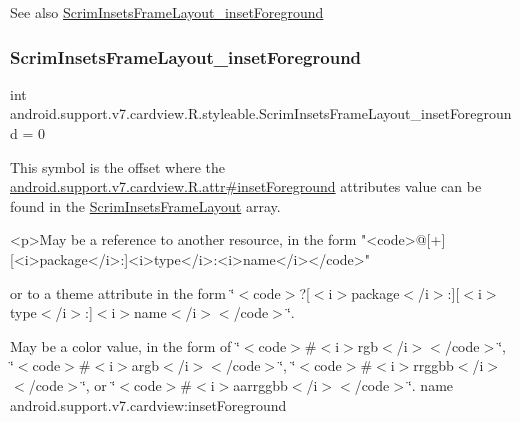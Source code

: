 \begin{DoxySeeAlso}{See also}
\hyperlink{classandroid_1_1support_1_1v7_1_1cardview_1_1R_1_1styleable_ab666cfd5d44681b7ad44530a1c3ac75b}{Scrim\+Insets\+Frame\+Layout\+\_\+inset\+Foreground} 
\end{DoxySeeAlso}
\mbox{\label{classandroid_1_1support_1_1v7_1_1cardview_1_1R_1_1styleable_ab666cfd5d44681b7ad44530a1c3ac75b}} 
\subsubsection{\texorpdfstring{Scrim\+Insets\+Frame\+Layout\+\_\+inset\+Foreground}{ScrimInsetsFrameLayout\_insetForeground}}
{\footnotesize\ttfamily int android.\+support.\+v7.\+cardview.\+R.\+styleable.\+Scrim\+Insets\+Frame\+Layout\+\_\+inset\+Foreground = 0\hspace{0.3cm}{\ttfamily [static]}}

This symbol is the offset where the \hyperlink{classandroid_1_1support_1_1v7_1_1cardview_1_1R_1_1attr_a95795ef97b87d63d0925b2729ce66ec9}{android.\+support.\+v7.\+cardview.\+R.\+attr\#inset\+Foreground} attribute\textquotesingle{}s value can be found in the \hyperlink{classandroid_1_1support_1_1v7_1_1cardview_1_1R_1_1styleable_a985cd1ba52cab7e08da09a84b07a9d58}{Scrim\+Insets\+Frame\+Layout} array.

\begin{DoxyVerb}      <p>May be a reference to another resource, in the form "<code>@[+][<i>package</i>:]<i>type</i>:<i>name</i></code>"
\end{DoxyVerb}
 or to a theme attribute in the form \char`\"{}$<$code$>$?\mbox{[}$<$i$>$package$<$/i$>$\+:\mbox{]}\mbox{[}$<$i$>$type$<$/i$>$\+:\mbox{]}$<$i$>$name$<$/i$>$$<$/code$>$\char`\"{}. 

May be a color value, in the form of \char`\"{}$<$code$>$\#$<$i$>$rgb$<$/i$>$$<$/code$>$\char`\"{}, \char`\"{}$<$code$>$\#$<$i$>$argb$<$/i$>$$<$/code$>$\char`\"{}, \char`\"{}$<$code$>$\#$<$i$>$rrggbb$<$/i$>$$<$/code$>$\char`\"{}, or \char`\"{}$<$code$>$\#$<$i$>$aarrggbb$<$/i$>$$<$/code$>$\char`\"{}.  name android.\+support.\+v7.\+cardview\+:inset\+Foreground \mbox{\label{classandroid_1_1support_1_1v7_1_1cardview_1_1R_1_1styleable_adee7a6b56432df3dafacd56ba69c4e85}} 
